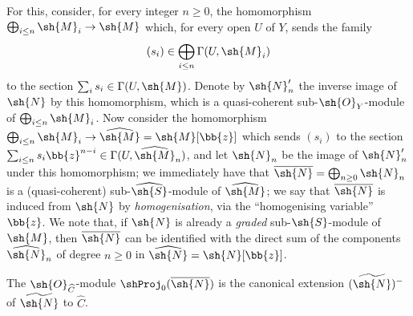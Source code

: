 \begin{env}[8.13.2]
\label{II.8.13.2}
For this, consider, for every integer $n\geq0$, the homomorphism $\bigoplus_{i\leq n}\sh{M}_i\to\sh{M}$ which, for every open $U$ of $Y$, sends the family
\[
    (s_i) \in \bigoplus_{i\leq n}\Gamma(U,\sh{M}_i)
\]
to the section $\sum_i s_i\in\Gamma(U,\sh{M})$.
Denote by $\sh{N}'_n$ the inverse image of $\sh{N}$ by this homomorphism, which is a quasi-coherent sub-$\sh{O}_Y$-module of $\bigoplus_{i\leq n}\sh{M}_i$.
Now consider the homomorphism $\bigoplus_{i\leq n}\sh{M}_i\to\widehat{\sh{M}}=\sh{M}[\bb{z}]$ which sends $(s_i)$ to the section $\sum_{i\leq n}s_i\bb{z}^{n-i}\in\Gamma(U,\widehat{\sh{M}}_n)$, and let $\sh{N}_n$ be the image of $\sh{N}'_n$ under this homomorphism;
we immediately have that $\overline{\sh{N}}=\bigoplus_{n\geq0}\sh{N}_n$ is a (quasi-coherent) sub-$\widehat{\sh{S}}$-module of $\widehat{\sh{M}}$;
we say that $\overline{\sh{N}}$ is induced from $\sh{N}$ by \emph{homogenisation}, via the ``homogenising variable'' $\bb{z}$.
We note
that, if $\sh{N}$ is already a \emph{graded} sub-$\sh{S}$-module of $\sh{M}$, then $\overline{\sh{N}}$ can be identified with the direct sum of the components $\widehat{\sh{N}}_n$ of degree $n\geq0$ in $\widehat{\sh{N}}=\sh{N}[\bb{z}]$.
\end{env}

\begin{proposition}[8.13.3]
\label{II.8.13.3}
The $\sh{O}_{\widehat{C}}$-module $\shProj_0(\overline{\sh{N}})$ is the canonical extension $(\widetilde{\sh{N}})^-$ of $\widetilde{\sh{N}}$ to $\widehat{C}$.
\end{proposition}


